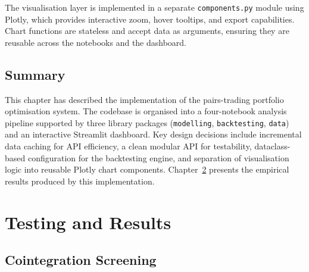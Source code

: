 \documentclass[a4paper]{report}
\begin{document}
The visualisation layer is implemented in a separate \texttt{components.py} module using Plotly, which provides interactive zoom, hover tooltips, and export capabilities. Chart functions are stateless and accept data as arguments, ensuring they are reusable across the notebooks and the dashboard.

\section{Summary}

This chapter has described the implementation of the pairs-trading portfolio optimisation system. The codebase is organised into a four-notebook analysis pipeline supported by three library packages (\texttt{modelling}, \texttt{backtesting}, \texttt{data}) and an interactive Streamlit dashboard. Key design decisions include incremental data caching for API efficiency, a clean modular API for testability, dataclass-based configuration for the backtesting engine, and separation of visualisation logic into reusable Plotly chart components. Chapter~\ref{chap:results} presents the empirical results produced by this implementation.

\chapter{Testing and Results}
\label{chap:results}
\section{Cointegration Screening}
\end{document}
